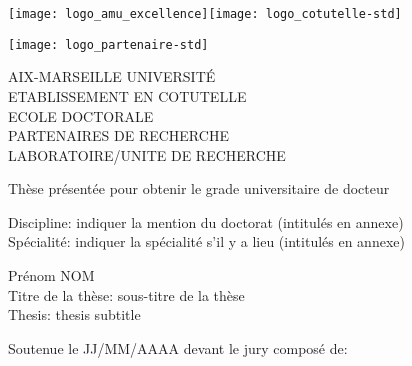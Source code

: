 {\selectfont
\vspace*{-2cm}
\begin{center}
	\begin{minipage}[c]{0.70\linewidth}
		\raggedright\texttt{[image: logo\_amu\_excellence]}\quad\texttt{[image: logo\_cotutelle-std]}
	\end{minipage}\hfill
	\begin{minipage}[c]{0.30\linewidth}
		\raggedleft\texttt{[image: logo\_partenaire-std]}
	\end{minipage}\hfill
\end{center}
\begin{flushleft}
	\vspace{0.2cm}
	\LARGE AIX-MARSEILLE UNIVERSITÉ\\
	\LARGE\textcolor{black!50}{ETABLISSEMENT EN COTUTELLE}\\
	\Large ECOLE DOCTORALE\\
	\vspace{0.2cm}
	\normalsize\textcolor{black!50}{PARTENAIRES DE RECHERCHE}\\
	\vspace{0.2cm}
	LABORATOIRE/UNITE DE RECHERCHE\\
    \begin{center}
		\vspace{1.8cm}
		Thèse présentée pour obtenir le grade universitaire de docteur\\
    \end{center}
	\vspace{0.5cm}
    Discipline: indiquer la mention du doctorat (intitulés en annexe)\\
    Spécialité: indiquer la spécialité s'il y a lieu (intitulés en annexe)\\
    \begin{center}
        \vspace{0.5cm}
        \Large Prénom NOM\\
        \vspace{1cm}
				\large Titre de la thèse: sous-titre de la thèse\\
				\vspace{0.5cm}
				\normalsize Thesis: thesis subtitle\\
    \end{center}
	\vspace{3.4cm}
    \normalsize Soutenue le JJ/MM/AAAA devant le jury composé de:\\

\end{flushleft}}
